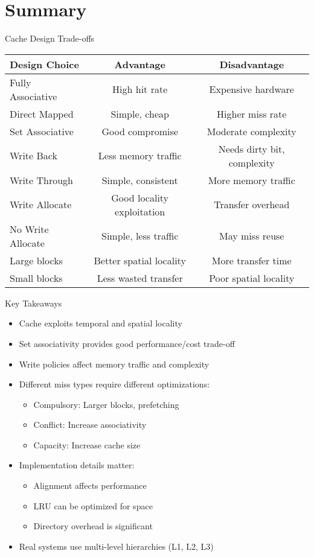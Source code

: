 \documentclass[aspectratio=169,12pt]{beamer}
\begin{document}
\section{Summary}
\begin{frame}{Cache Design Trade-offs}
\begin{table}
\centering
\small
\begin{tabular}{lcc}
\toprule
\textbf{Design Choice} & \textbf{Advantage} & \textbf{Disadvantage} \\
\midrule
Fully Associative & High hit rate & Expensive hardware \\
Direct Mapped & Simple, cheap & Higher miss rate \\
Set Associative & Good compromise & Moderate complexity \\
\midrule
Write Back & Less memory traffic & Needs dirty bit, complexity \\
Write Through & Simple, consistent & More memory traffic \\
\midrule
Write Allocate & Good locality exploitation & Transfer overhead \\
No Write Allocate & Simple, less traffic & May miss reuse \\
\midrule
Large blocks & Better spatial locality & More transfer time \\
Small blocks & Less wasted transfer & Poor spatial locality \\
\bottomrule
\end{tabular}
\end{table}
\end{frame}

\begin{frame}{Key Takeaways}
\begin{itemize}
    \item Cache exploits temporal and spatial locality
    \item Set associativity provides good performance/cost trade-off
    \item Write policies affect memory traffic and complexity
    \item Different miss types require different optimizations:
    \begin{itemize}
        \item Compulsory: Larger blocks, prefetching
        \item Conflict: Increase associativity
        \item Capacity: Increase cache size
    \end{itemize}
    \item Implementation details matter:
    \begin{itemize}
        \item Alignment affects performance
        \item LRU can be optimized for space
        \item Directory overhead is significant
    \end{itemize}
    \item Real systems use multi-level hierarchies (L1, L2, L3)
\end{itemize}
\end{frame}
\end{document}
